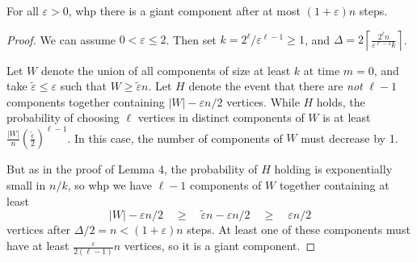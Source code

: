 \documentclass[twoside,10pt]{report}
\begin{document}

\begin{prop}
	For all $\varepsilon>0$, whp there is a giant component after at most $(1+\varepsilon)n$ steps.
\end{prop}
\begin{proof}
	We can assume $0 < \varepsilon \leq 2$. Then set $k = 2^{\ell}/\varepsilon^{\ell-1} \geq 1$, and $\Delta = 2 \left\lceil \frac{2^{\ell}n}{\varepsilon^{\ell-1}k} \right\rceil$.

	Let $W$ denote the union of all components of size at least $k$ at time $m=0$, and take $\tilde{\varepsilon} \leq \varepsilon$ such that $W \geq \tilde{\varepsilon}n$. Let $H$ denote the event that there are \textit{not} $\ell-1$ components together containing $|W| - \varepsilon n /2$ vertices. While $H$ holds, the probability of choosing $\ell$ vertices in distinct components of $W$ is at least $\frac{|W|}{n} \left( \frac{\tilde{\varepsilon}}{2}  \right)^{\ell-1}$. In this case, the number of components of $W$ must decrease by 1.

But as in the proof of Lemma 4, the probability of $H$ holding is exponentially small in $n/k$, so whp we have $\ell-1$ components of $W$ together containing at least
\[
	|W| - \varepsilon n /2 \quad\geq\quad \tilde{\varepsilon}n - \varepsilon n / 2 \quad\geq\quad \varepsilon n/2
\]
vertices after $\Delta/2 = n < (1+\varepsilon)n$ steps. At least one of these components must have at least $\frac{\varepsilon}{2(\ell-1)} n$ vertices, so it is a giant component.
\end{proof}
\end{document}
